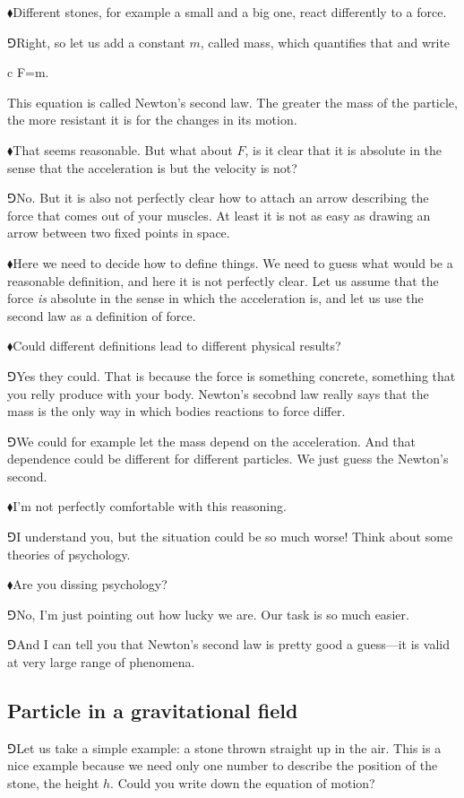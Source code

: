 \documentclass[10pt,oneside%
]{memoir}
\newenvironment{eqna}{\begin{IEEEeqnarray*}{c}}{\end{IEEEeqnarray*}\ignorespacesafterend}
\newcommand{\hea}{\(\blacklozenge\)\;}
\newcommand{\heb}{\(\Game\)\;}
\begin{document}
\hea Different stones, for example a small and a big one, react differently to a force.

\heb Right, so let us add a constant \(m\), called mass, which quantifies that and write
\begin{eqna}
    F=m.
\end{eqna}
This equation is called Newton's second law. The greater the mass of the particle, the more resistant it is for the changes in its motion.

\hea That seems reasonable. But what about \(F\), is it clear that it is absolute in the sense that the acceleration is but the velocity is not?

\heb No. But it is also not perfectly clear how to attach an arrow describing the force that comes out of your muscles. At least it is not as easy as drawing an arrow between two fixed points in space.

\hea Here we need to decide how to define things. We need to guess what would be a reasonable definition, and here it is not perfectly clear. Let us assume that the force \emph{is} absolute in the sense in which the acceleration is, and let us use the second law as a definition of force.

\hea Could different definitions lead to different physical results?

\heb Yes they could. That is because the force is something concrete, something that you relly produce with your body. Newton's secobnd law really says that the mass is the only way in which bodies reactions to force differ.

\heb We could for example let the mass depend on the acceleration. And that dependence could be different for different particles. We just guess the Newton's second.

\hea I'm not perfectly comfortable with this reasoning.

\heb I understand you, but the situation could be so much worse! Think about some theories of psychology.

\hea Are you dissing psychology?

\heb No, I'm just pointing out how lucky we are. Our task is so much easier.

\heb And I can tell you that Newton's second law is pretty good a guess---it is valid at very large range of phenomena.
\subsection{Particle in a gravitational field}
\heb Let us take a simple example: a stone thrown straight up in the air. This is a nice example because we need only one number to describe the position of the stone, the height \(h\). Could you write down the equation of motion?
\end{document}
